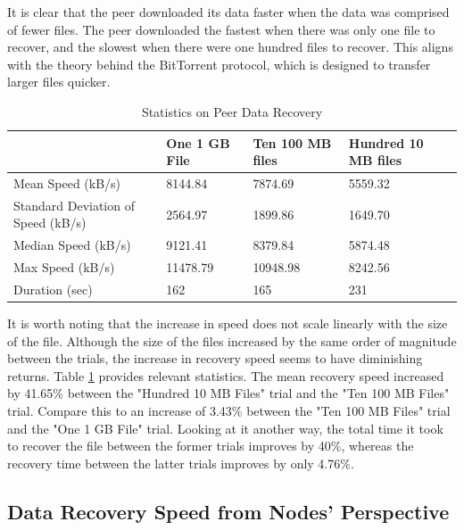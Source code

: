\documentclass[12pt]{report}
\begin{document}
It is clear that the peer downloaded its data faster when the data was comprised of fewer files. The peer downloaded the fastest when there was only one file to recover, and the slowest when there were one hundred files to recover. This aligns with the theory behind the BitTorrent protocol, which is designed to transfer larger files quicker.

\begin{table}
\begin{adjustwidth}{-.5in}{-.5in}
\centering
    \begin{tabular}{| l | l | l | l |}
    \hline
    & One 1 GB File & Ten 100 MB files & Hundred 10 MB files \\ \hline
    Mean Speed (kB/s)& 8144.84 & 7874.69 & 5559.32 \\ \hline
    Standard Deviation of Speed (kB/s) & 2564.97 & 1899.86 & 1649.70 \\ \hline
    Median Speed (kB/s)& 9121.41 & 8379.84 & 5874.48 \\ \hline
    Max Speed (kB/s) & 11478.79 & 10948.98 & 8242.56 \\ \hline
    Duration (sec) & 162 & 165 & 231 \\ \hline
    \end{tabular}
    \caption{Statistics on Peer Data Recovery}
    \label{tab:PeerRecoverySpeed}
\end{adjustwidth}
\end{table}

It is worth noting that the increase in speed does not scale linearly with the size of the file. Although the size of the files increased by the same order of magnitude between the trials, the increase in recovery speed seems to have diminishing returns. Table \ref{tab:PeerRecoverySpeed} provides relevant statistics. The mean recovery speed increased by 41.65\% between the "Hundred 10 MB Files" trial and the "Ten 100 MB Files" trial. Compare this to an increase of 3.43\% between the "Ten 100 MB Files" trial and the "One 1 GB File" trial. Looking at it another way, the total time it took to recover the file between the former trials improves by 40\%, whereas the recovery time between the latter trials improves by only 4.76\%.

\subsection{Data Recovery Speed from Nodes' Perspective} \label{subsec:DataRecoverySpeedfromNodesPerspective}
\end{document}
